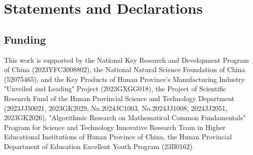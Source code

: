 \documentclass[pdflatex,sn-mathphys-num]{sn-jnl}%
\theoremstyle{thmstyleone}%
\theoremstyle{thmstyletwo}%
\theoremstyle{thmstylethree}%
\begin{document}















% 
% 

% 
\section*{Statements and Declarations}
\subsection*{Funding}

This work is supported by the National Key Research and Development Program of China (2023YFC3008802), the National Natural Science Foundation of China (52075465), and the Key Products of Hunan Province's Manufacturing Industry "Unveiled and Leading" Project (2023GXGG018), the Project of Scientific Research Fund of the Hunan Provincial Science and Technology Department (2023JJ50021, 2023GK2029, No.2024JC1003, No.2024JJ1008, 2024JJ2051, 2023GK2026), "Algorithmic Research on Mathematical Common Fundamentals" Program for Science and Technology Innovative Research Team in Higher Educational Institutions of Hunan Province of China, the Hunan Provincial Department of Education Excellent Youth Program (23B0162).
\end{document}
